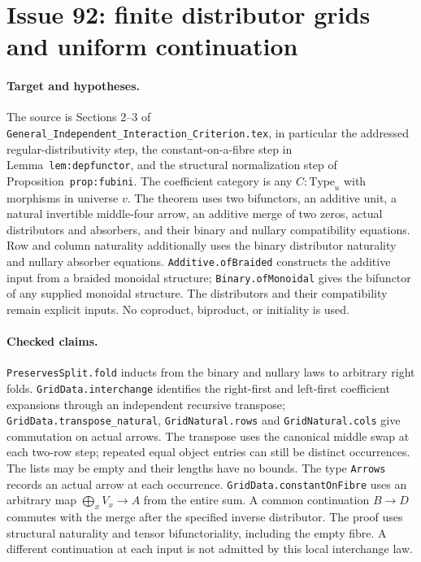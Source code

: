 \documentclass{article}
\begin{document}
\section*{Issue 92: finite distributor grids and uniform continuation}
\paragraph{Target and hypotheses.}
The source is Sections 2--3 of
\texttt{General\_Independent\_Interaction\_Criterion.tex}, in particular
the addressed regular-distributivity step, the constant-on-a-fibre step
in Lemma~\texttt{lem:depfunctor}, and the structural normalization step
of Proposition~\texttt{prop:fubini}.
The coefficient category is any \(C:\mathrm{Type}_u\) with morphisms in
universe \(v\). The theorem uses two bifunctors, an additive unit,
a natural invertible middle-four arrow, an additive merge of two zeros,
actual distributors and absorbers, and their binary and nullary
compatibility equations. Row and column naturality additionally uses
the binary distributor naturality and nullary absorber equations.
\texttt{Additive.ofBraided} constructs the additive input from a braided
monoidal structure; \texttt{Binary.ofMonoidal} gives the bifunctor of any
supplied monoidal structure. The distributors and their compatibility
remain explicit inputs. No coproduct, biproduct, or initiality is used.

\paragraph{Checked claims.}
\texttt{PreservesSplit.fold} inducts from the binary and nullary laws to
arbitrary right folds. \texttt{GridData.interchange} identifies the right-first
and left-first coefficient expansions through an independent recursive
transpose; \texttt{GridData.transpose\_natural},
\texttt{GridNatural.rows} and \texttt{GridNatural.cols} give commutation
on actual arrows. The transpose uses the canonical middle swap at each
two-row step; repeated equal object entries can still be distinct
occurrences. The lists may be empty and their lengths have no bounds.
The type \texttt{Arrows} records an actual arrow at each occurrence.
\texttt{GridData.constantOnFibre} uses an arbitrary map
\(\bigoplus_x V_x \to A\) from the entire sum. A common continuation
\(B\to D\) commutes with the merge after the specified inverse distributor.
The proof uses structural naturality and tensor bifunctoriality, including
the empty fibre. A different continuation at each input is not admitted
by this local interchange law.
\end{document}
